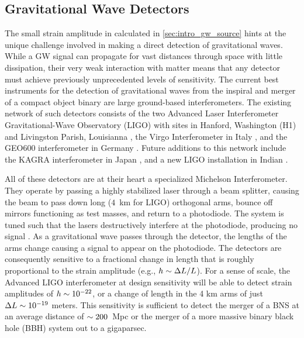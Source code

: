 \subsection{Gravitational Wave Detectors}
\label{sec:intro_gw_det}
The small strain amplitude in calculated in \cref{sec:intro_gw_source} hints at the unique challenge involved in making a direct detection of gravitational waves. While a GW signal can propagate for vast distances through space with little dissipation, their very weak interaction with matter means that any detector must achieve previously unprecedented levels of sensitivity. The current best instruments for the detection of gravitational waves from the inspiral and merger of a compact object binary are large ground-based interferometers. The existing network of such detectors consists of the two Advanced Laser Interferometer Gravitational-Wave Observatory (LIGO) with sites in Hanford, Washington (H1) and Livingston Parish, Louisianna \citep[L1,][]{LIGOEarlyRef,LIGOMainRef}, the Virgo Interferometer in Italy \citep{VirgoC7Burst,VIRGORef}, and the GEO600 interferometer in Germany \citep{GEOMainRef}. Future additions to this network include the KAGRA interferometer in Japan \citep{KAGRA}, and a new LIGO installation in Indian \citep[LIGO-India,][]{LIGOIndia}.

All of these detectors are at their heart a specialized Michelson Interferometer. They operate by passing a highly stabilized laser through a beam splitter, causing the beam to pass down long ($4$~km for LIGO) orthogonal arms, bounce off mirrors functioning as test masses, and return to a photodiode. The system is tuned such that the lasers destructively interfere at the photodiode, producing no signal \citep[see e.g.,][and references therein]{LIGOMainRef,Adhikari2014}. As a gravitational wave passes through the detector, the lengths of the arms change causing a signal to appear on the photodiode. The detectors are consequently sensitive to a fractional change in length that is roughly proportional to the strain amplitude (e.g., $h \sim \Delta L / L$). For a sense of scale, the Advanced LIGO interferometer at design sensitivity will be able to detect strain amplitudes of $h \sim 10^{-22}$, or a change of length in the 4 km arms of just $\Delta L \sim 10^{-19}$ meters. This sensitivity is sufficient to detect the merger of a BNS at an average distance of $\sim 200$~Mpc or the merger of a more massive binary black hole (BBH) system out to a gigaparsec.

